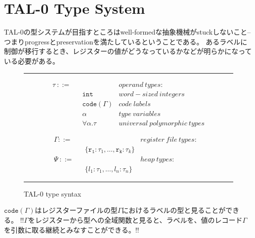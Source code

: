 \documentclass[a4paper,oneside]{ltjsarticle}
\begin{document}
\section{TAL-0 Type System}
TAL-0の型システムが目指すところはwell-formedな抽象機械がstuckしないこと--つまりprogressとpreservationを満たしているということである。
あるラベルに制御が移行するとき、レジスターの値がどうなっているかなどが明らかになっている必要がある。

\begin{figure}[ht]
	\noindent\hrule{}

	\begin{minipage}[t]{.5\textwidth}
		\begin{align*}
		&\tau\ \mathtt{::=}&&&operand\ types:&\\
		 &&&\mathtt{int}&word-sized\ integers&\\
		 &&&\mathtt{code}(\Gamma)&code\ labels&\\
		 &&&\alpha&type\ variables&\\
		 &&&\forall\alpha.\tau&universal\ polymorphic\ types&
		\end{align*}
	\end{minipage}%
	\vrule{}
	\begin{minipage}[t]{.5\textwidth}
		\begin{align*}
			&\Gamma \mathtt{::=}&&&register\ file\ types:&\\
			&&&\{\mathtt{r_1}:\tau_1,\dots,\mathtt{r_k}:\tau_k\}&&&\\
			&\Psi\ \mathtt{::=}&&&heap\ types:&\\
			&&&\{l_1:\tau_1,\dots,l_n:\tau_n\}&&&
		\end{align*}
	\end{minipage}

	\noindent\hrule{}
	\caption{TAL-0 type syntax}
\end{figure}

$\mathtt{code}(\Gamma)$はレジスターファイルの型$\Gamma$におけるラベルの型と見ることができる。
!!$\Gamma$をレジスターから型への全域関数と見ると、ラベルを、値のレコード$\Gamma$を引数に取る継続とみなすことができる。!!
\end{document}
